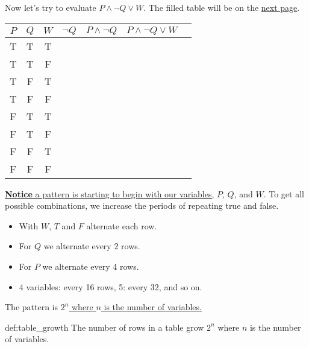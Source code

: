 \vspace{1em}
\noindent
Now let's try to evaluate $P \land \neg Q \lor W$. The filled table will be on the \underline{next page}.

\begin{center}
    \begin{tabular}{|c|c|c|c|c|c|c|}
        \hline
        \rowcolor{OliveGreen!10}
        $P$ & $Q$ & $W$ & $\neg Q$ & $P \land \neg Q$ & $P \land \neg Q \lor W$ \\
        \hline
        T   & T   & T   &          &                  &                         \\
        T   & T   & F   &          &                  &                         \\
        T   & F   & T   &          &                  &                         \\
        T   & F   & F   &          &                  &                         \\
        F   & T   & T   &          &                  &                         \\
        F   & T   & F   &          &                  &                         \\
        F   & F   & T   &          &                  &                         \\
        F   & F   & F   &          &                  &                         \\
        \hline
    \end{tabular}
\end{center}

\noindent
\underline{\textbf{Notice} a pattern is starting to begin with our variables,} $P$, $Q$, and $W$. To get
all possible combinations, we increase the periods of repeating true and false.
\begin{itemize}
    \item With $W$, $T$ and $F$ alternate each row.
    \item For $Q$ we alternate every 2 rows.
    \item For $P$ we alternate every 4 rows.
    \item 4 variables: every 16 rows, 5: every 32, and so on.
\end{itemize}
The pattern is \underline{$2^n$ where $n$ is the number of variables.}\\

\begin{Def}{def:table_growth}
    The number of rows in a table grow $2^n$ where $n$ is the number of variables.
\end{Def}

